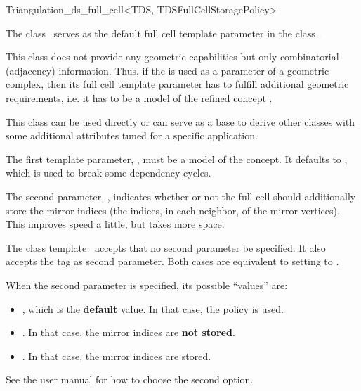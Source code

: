 \begin{ccRefClass}{Triangulation_ds_full_cell<TDS, TDSFullCellStoragePolicy>}

\ccDefinition

The class \ccRefName\ serves as the default full cell template parameter in the
class .

This class does not provide any geometric capabilities but only combinatorial
(adjacency) information. Thus, if the  is
used as a parameter of a geometric complex, then its full cell template
parameter has to fulfill additional geometric requirements, i.e. it has to be
a model of the refined concept .

This class can be used directly or can serve as a base to derive other classes
with some additional attributes tuned for a specific application.


\ccParameters

The first template parameter, , must be a model of the
 concept. It defaults to , which is
used to break some dependency cycles.

The second parameter, , indicates whether or not
the full cell should additionally store the mirror indices (the indices, in each
neighbor, of the mirror vertices). This improves speed a little, but takes
more space:

The class template \ccRefName\ accepts that no second parameter be specified.
It also accepts the tag  as second parameter. Both cases are
equivalent to setting  to
.

When the second parameter is specified, its possible ``values''
are:\begin{itemize}

\item {}, which is the \textbf{default} value. In that case, the
policy  is used.

\item {}. In that case, the mirror
indices are \textbf{not stored}.

\item {}. In that case, the mirror
indices are stored.
\end{itemize}
See the user manual  for how to choose the second option.

\ccIsModel


\ccSeeAlso


\end{ccRefClass}
